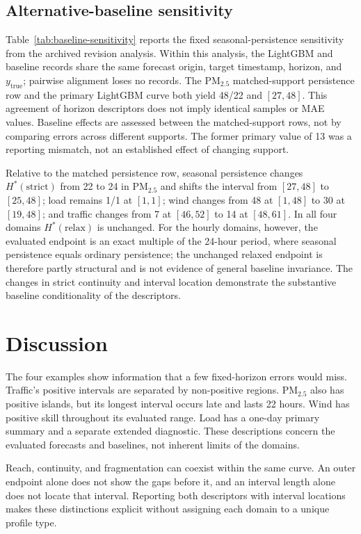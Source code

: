 \documentclass[pdflatex]{sn-jnl}
\begin{document}
\subsection{Alternative-baseline sensitivity}
Table~\ref{tab:baseline-sensitivity} reports the fixed seasonal-persistence
sensitivity from the archived revision analysis. Within this analysis,
the LightGBM and baseline records share the same forecast origin, target
timestamp, horizon, and $y_{\mathrm{true}}$; pairwise alignment loses no
records. The PM$_{2.5}$ matched-support persistence row and the primary
LightGBM curve both yield 48/22 and $[27,48]$. This agreement of horizon
descriptors does not imply identical samples or MAE values. Baseline
effects are assessed between the matched-support rows, not by comparing
errors across different supports. The former primary value of 13 was a
reporting mismatch, not an established effect of changing support.

Relative to the matched persistence row, seasonal persistence changes
$H^*(\mathrm{strict})$ from 22 to 24 in PM$_{2.5}$ and shifts the interval
from $[27,48]$ to $[25,48]$; load remains 1/1 at $[1,1]$; wind changes from
48 at $[1,48]$ to 30 at $[19,48]$; and traffic changes from 7 at $[46,52]$
to 14 at $[48,61]$. In all four domains $H^*(\mathrm{relax})$ is unchanged.
For the hourly domains, however, the evaluated endpoint is an exact multiple
of the 24-hour period, where seasonal persistence equals ordinary persistence;
the unchanged relaxed endpoint is therefore partly structural and is not
evidence of general baseline invariance. The changes in strict continuity and
interval location demonstrate the substantive baseline conditionality of the
descriptors.



\section{Discussion}
The four examples show information that a few fixed-horizon errors would
miss. Traffic's positive intervals are separated by non-positive regions.
PM$_{2.5}$ also has positive islands, but its longest interval occurs late
and lasts 22 hours. Wind has positive skill throughout its evaluated range.
Load has a one-day primary summary and a separate extended diagnostic.
These descriptions concern the evaluated forecasts and baselines, not
inherent limits of the domains.

Reach, continuity, and fragmentation can coexist within the same curve.
An outer endpoint alone does not show the gaps before it, and an interval
length alone does not locate that interval. Reporting both descriptors
with interval locations makes these distinctions explicit without
assigning each domain to a unique profile type.
\end{document}
